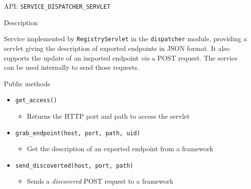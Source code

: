 \begin{frame}{API: \texttt{SERVICE\_DISPATCHER\_SERVLET}}
\begin{block}{Description}
\begin{small}
Service implemented by \texttt{RegistryServlet} in the \texttt{dispatcher} module, providing a servlet
giving the description of exported endpoints in JSON format.
It also supports the update of an imported endpoint \textit{via} a POST request.
The service can be used internally to send those requests.
\end{small}
\end{block}

\begin{block}{Public methods}
\begin{small}
\begin{itemize}
\vspace{-.1em}
\item[] \texttt{get\_access()}
\begin{itemize}
\vspace{-.4em}
\item[] Returns the HTTP port and path to access the servlet
\end{itemize}
\vspace{-.1em}
\item[] \texttt{grab\_endpoint(host, port, path, uid)}
\begin{itemize}
\vspace{-.4em}
\item[] Get the description of an exported endpoint from a framework
\end{itemize}
\vspace{-.1em}
\item[] \texttt{send\_discoverted(host, port, path)}
\begin{itemize}
\vspace{-.4em}
\item[] Sends a \textit{discovered} POST request to a framework
\end{itemize}
\end{itemize}
\end{small}
\end{block}
\end{frame}

